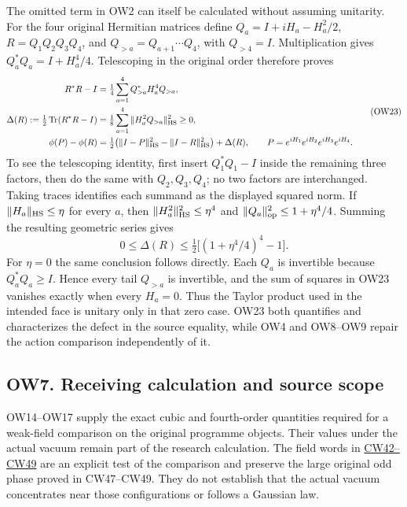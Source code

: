 \documentclass[11pt]{article}
\begin{document}
The omitted term in OW2 can itself be calculated without assuming unitarity. For the four original Hermitian matrices define \(Q_a=I+iH_a-H_a^2/2\), \(R=Q_1Q_2Q_3Q_4\), and \(Q_{>a}=Q_{a+1}\cdots Q_4\), with \(Q_{>4}=I\). Multiplication gives \(Q_a^*Q_a=I+H_a^4/4\). Telescoping in the original order therefore proves
\[
 \begin{aligned}
 R^*R-I&=\tfrac14\sum_{a=1}^4Q_{>a}^*H_a^4Q_{>a},\\
 \Delta(R):=\tfrac12\operatorname{Tr}(R^*R-I)
 &=\tfrac18\sum_{a=1}^4\|H_a^2Q_{>a}\|_{\rm HS}^2\ge0,\\
 \phi(P)-\phi(R)
 &=\tfrac12\big(\|I-P\|_{\rm HS}^2-\|I-R\|_{\rm HS}^2\big)
       +\Delta(R),\qquad P=e^{iH_1}e^{iH_2}e^{iH_3}e^{iH_4}.
 \end{aligned}                                               \tag{OW23}
\]
To see the telescoping identity, first insert \(Q_1^*Q_1-I\) inside the remaining three factors, then do the same with \(Q_2,Q_3,Q_4\); no two factors are interchanged. Taking traces identifies each summand as the displayed squared norm. If \(\|H_a\|_{\rm HS}\le\eta\) for every \(a\), then \(\|H_a^2\|_{\rm HS}^2\le\eta^4\) and \(\|Q_a\|_{\rm op}^2\le1+\eta^4/4\). Summing the resulting geometric series gives
\[
 0\le\Delta(R)\le\tfrac12\big[(1+\eta^4/4)^4-1\big].
\]
For \(\eta=0\) the same conclusion follows directly. Each \(Q_a\) is invertible because \(Q_a^*Q_a\ge I\). Hence every tail \(Q_{>a}\) is invertible, and the sum of squares in OW23 vanishes exactly when every \(H_a=0\). Thus the Taylor product used in the intended face is unitary only in that zero case. OW23 both quantifies and characterizes the defect in the source equality, while OW4 and OW8–OW9 repair the action comparison independently of it.

\subsection*{OW7. Receiving calculation and source scope}

OW14–OW17 supply the exact cubic and fourth-order quantities required for a weak-field comparison on the original programme objects. Their values under the actual vacuum remain part of the research calculation. The field words in \href{https://github.com/KokunoYumeto/yang-mills-interacting-workbench/blob/dbbcbaf7e8d50e41f7491dc9bbed1c0c6ed54b0c/yang-mills/continuations/20261011-central-signs-shrinking-window/CURVATURE_ROOTED_WORDS.md}{CW42–CW49} are an explicit test of the comparison and preserve the large original odd phase proved in CW47–CW49. They do not establish that the actual vacuum concentrates near those configurations or follows a Gaussian law.
\end{document}
